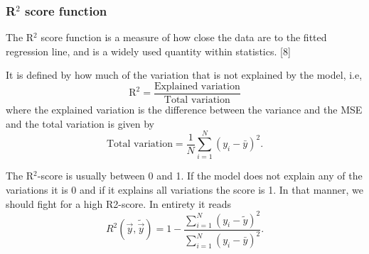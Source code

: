 \subsubsection{R$^2$ score function} \label{sec:R2}
The R$^2$ score function is a measure of how close the data are to the fitted regression line, and is a widely used quantity within statistics. [8]

It is defined by how much of the variation that is not explained by the model, i.e, 
\begin{equation*}
\text{R}^2=\frac{\text{Explained variation}}{\text{Total variation}}
\end{equation*}
where the explained variation is the difference between the variance and the MSE and the total variation is given by
\begin{equation*}
\text{Total variation}=\frac{1}{N}\sum_{i=1}^N(y_i-\bar{y})^2.
\end{equation*}

The R$^2$-score is usually between 0 and 1. If the model does not explain any of the variations it is 0 and if it explains all variations the score is 1. In that manner, we should fight for a high R2-score. In entirety it reads
\begin{equation}
R^2(\vec{y},\tilde{\vec{y}})=1-\frac{\sum_{i=1}^N(y_i-\tilde{y})^2}{\sum_{i=1}^N(y_i-\bar{y})^2}.
\end{equation}